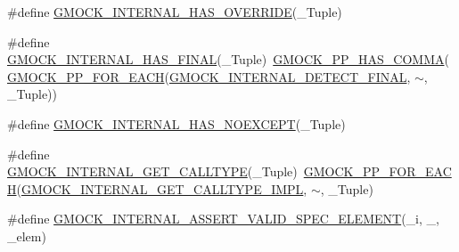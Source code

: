 \begin{DoxyCompactItemize}
\item 
\#define \mbox{\hyperlink{googletest-master_2googlemock_2include_2gmock_2gmock-function-mocker_8h_aef5aaab325100a13fee33dd6029463dd}{G\+M\+O\+C\+K\+\_\+\+I\+N\+T\+E\+R\+N\+A\+L\+\_\+\+H\+A\+S\+\_\+\+O\+V\+E\+R\+R\+I\+DE}}(\+\_\+\+Tuple)
\item 
\#define \mbox{\hyperlink{googletest-master_2googlemock_2include_2gmock_2gmock-function-mocker_8h_a1c4b4308770f5ff925ba9ed1bf578644}{G\+M\+O\+C\+K\+\_\+\+I\+N\+T\+E\+R\+N\+A\+L\+\_\+\+H\+A\+S\+\_\+\+F\+I\+N\+AL}}(\+\_\+\+Tuple)~\mbox{\hyperlink{_obj__test_2lib_2googletest-master_2googlemock_2include_2gmock_2internal_2gmock-pp_8h_aaf83e01e56eb26d7eac9efb477587510}{G\+M\+O\+C\+K\+\_\+\+P\+P\+\_\+\+H\+A\+S\+\_\+\+C\+O\+M\+MA}}(\mbox{\hyperlink{_obj__test_2lib_2googletest-master_2googlemock_2include_2gmock_2internal_2gmock-pp_8h_abc9368d9b0960531e3cfb9e5d6a41816}{G\+M\+O\+C\+K\+\_\+\+P\+P\+\_\+\+F\+O\+R\+\_\+\+E\+A\+CH}}(\mbox{\hyperlink{_obj__test_2lib_2googletest-master_2googlemock_2include_2gmock_2gmock-function-mocker_8h_a2b0f53a8fea3a79d52582daf294737b0}{G\+M\+O\+C\+K\+\_\+\+I\+N\+T\+E\+R\+N\+A\+L\+\_\+\+D\+E\+T\+E\+C\+T\+\_\+\+F\+I\+N\+AL}}, $\sim$, \+\_\+\+Tuple))
\item 
\#define \mbox{\hyperlink{googletest-master_2googlemock_2include_2gmock_2gmock-function-mocker_8h_adfda8885b556882ad81e7ea73ce26cf1}{G\+M\+O\+C\+K\+\_\+\+I\+N\+T\+E\+R\+N\+A\+L\+\_\+\+H\+A\+S\+\_\+\+N\+O\+E\+X\+C\+E\+PT}}(\+\_\+\+Tuple)
\item 
\#define \mbox{\hyperlink{googletest-master_2googlemock_2include_2gmock_2gmock-function-mocker_8h_a0408d6cf7e0952ffa068be1944b6e048}{G\+M\+O\+C\+K\+\_\+\+I\+N\+T\+E\+R\+N\+A\+L\+\_\+\+G\+E\+T\+\_\+\+C\+A\+L\+L\+T\+Y\+PE}}(\+\_\+\+Tuple)~\mbox{\hyperlink{_obj__test_2lib_2googletest-master_2googlemock_2include_2gmock_2internal_2gmock-pp_8h_abc9368d9b0960531e3cfb9e5d6a41816}{G\+M\+O\+C\+K\+\_\+\+P\+P\+\_\+\+F\+O\+R\+\_\+\+E\+A\+CH}}(\mbox{\hyperlink{_obj__test_2lib_2googletest-master_2googlemock_2include_2gmock_2gmock-function-mocker_8h_a917552654709591f0b38c20f16018b1e}{G\+M\+O\+C\+K\+\_\+\+I\+N\+T\+E\+R\+N\+A\+L\+\_\+\+G\+E\+T\+\_\+\+C\+A\+L\+L\+T\+Y\+P\+E\+\_\+\+I\+M\+PL}}, $\sim$, \+\_\+\+Tuple)
\item 
\#define \mbox{\hyperlink{googletest-master_2googlemock_2include_2gmock_2gmock-function-mocker_8h_a6043d8b0a21556d205e729fa9c8da600}{G\+M\+O\+C\+K\+\_\+\+I\+N\+T\+E\+R\+N\+A\+L\+\_\+\+A\+S\+S\+E\+R\+T\+\_\+\+V\+A\+L\+I\+D\+\_\+\+S\+P\+E\+C\+\_\+\+E\+L\+E\+M\+E\+NT}}(\+\_\+i,  \+\_\+,  \+\_\+elem)
\item 

\end{DoxyCompactItemize}
